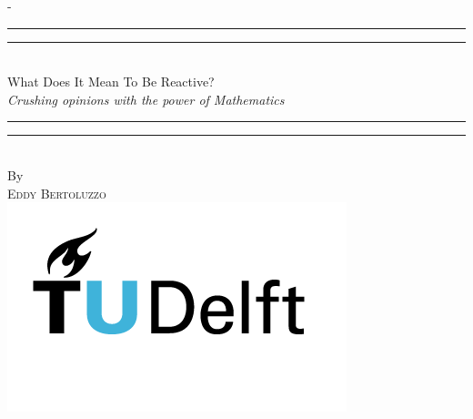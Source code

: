 %
%
% 
%
%
\begin{titlingpage}
\begin{SingleSpace}
\calccentering{\unitlength} 
\begin{adjustwidth*}{\unitlength}{-\unitlength}
\vspace*{13mm}
\begin{center}
\rule[0.5ex]{\linewidth}{2pt}\vspace*{-\baselineskip}\vspace*{3.2pt}
\rule[0.5ex]{\linewidth}{1pt}\\[\baselineskip]
{\HUGE What Does It Mean To Be Reactive?}\\[4mm]
{\Large \textit{Crushing opinions with the power of Mathematics}}\\
\rule[0.5ex]{\linewidth}{1pt}\vspace*{-\baselineskip}\vspace{3.2pt}
\rule[0.5ex]{\linewidth}{2pt}\\
\vspace{6.5mm}
{\large By}\\
\vspace{6.5mm}
{\large\textsc{Eddy Bertoluzzo}}\\
\vspace{11mm}
\includegraphics[scale=0.6]{logos/TU_Delft_logo_RGB}\\

\end{center}
\end{adjustwidth*}
\end{SingleSpace}
\end{titlingpage}
